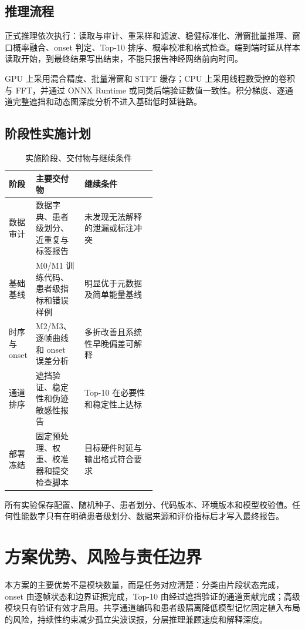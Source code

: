 \subsection{推理流程}

正式推理依次执行：读取与审计、重采样和滤波、稳健标准化、滑窗批量推理、窗口概率融合、onset 判定、Top-10 排序、概率校准和格式检查。端到端时延从样本读取开始，到最终结果写出结束，不能只报告神经网络前向时间。

GPU 上采用混合精度、批量滑窗和 STFT 缓存；CPU 上采用线程数受控的卷积与 FFT，并通过 ONNX Runtime 或同类后端验证数值一致性。积分梯度、逐通道完整遮挡和动态图深度分析不进入基础低时延链路。

\subsection{阶段性实施计划}

\begin{table}[htbp]
\centering
{}
\caption{实施阶段、交付物与继续条件}
\label{tab:milestones-v3}
\renewcommand{\arraystretch}{1.35}
\begin{tabularx}{\linewidth}{@{}p{0.17\linewidth}p{0.33\linewidth}X@{}}
\toprule
\textbf{阶段} & \textbf{主要交付物} & \textbf{继续条件} \\
\midrule
数据审计 & 数据字典、患者级划分、近重复与标签报告 & 未发现无法解释的泄漏或标注冲突 \\
基础基线 & M0/M1 训练代码、患者级指标和错误样例 & 明显优于元数据及简单能量基线 \\
时序与 onset & M2/M3、逐帧曲线和 onset 误差分析 & 多折改善且系统性早晚偏差可解释 \\
通道排序 & 遮挡验证、稳定性和伪迹敏感性报告 & Top-10 在必要性和稳定性上达标 \\
部署冻结 & 固定预处理、权重、校准器和提交检查脚本 & 目标硬件时延与输出格式符合要求 \\
\bottomrule
\end{tabularx}
\end{table}

所有实验保存配置、随机种子、患者划分、代码版本、环境版本和模型校验值。任何性能数字只有在明确患者级划分、数据来源和评价指标后才写入最终报告。

\section{方案优势、风险与责任边界}

本方案的主要优势不是模块数量，而是任务对应清楚：分类由片段状态完成，onset 由逐帧状态和边界证据完成，Top-10 由经过遮挡验证的通道贡献完成；高级模块只有验证有效才启用。共享通道编码和患者级隔离降低模型记忆固定植入布局的风险，持续性约束减少孤立尖波误报，分层推理兼顾速度和解释深度。

